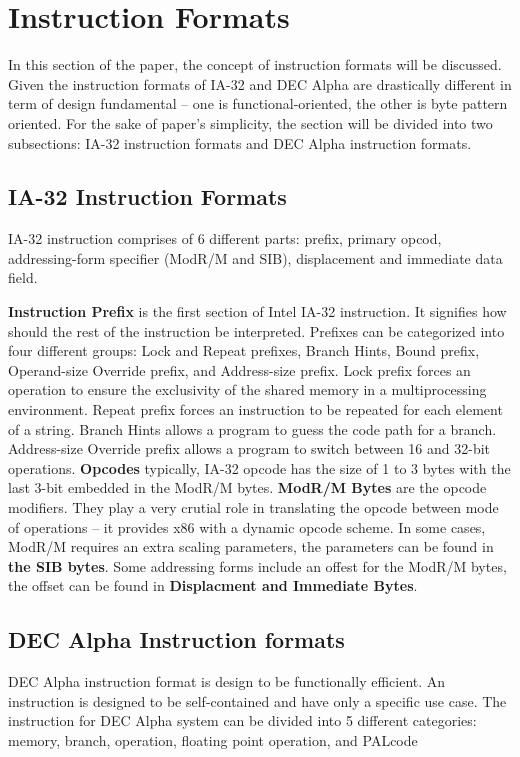 \documentclass[letterpaper,10pt,titlepage]{article}
\begin{document}
\section{Instruction Formats}
In this section of the paper, the concept of instruction formats  will be
discussed. Given the instruction formats of IA-32 and DEC Alpha are drastically 
different in term of design fundamental -- one is functional-oriented, the other is
byte pattern oriented. For the sake of paper's simplicity, the section will be divided 
into two subsections: IA-32 instruction formats and DEC Alpha instruction formats. 
\subsection{IA-32 Instruction Formats}
IA-32 instruction comprises of 6 different parts: prefix, primary opcod, addressing-form
specifier (ModR/M and SIB), displacement and immediate data field. 


\textbf{Instruction Prefix} is the first section of Intel IA-32 instruction. 
It signifies how should the rest of the instruction be interpreted. Prefixes can be 
categorized into four different groups: Lock and Repeat prefixes, Branch Hints, Bound
prefix, Operand-size Override prefix, and Address-size prefix. Lock prefix 
forces an operation to ensure the exclusivity of the shared memory in a multiprocessing 
environment. Repeat prefix forces an instruction to be repeated for each element
of a string. Branch Hints allows a program to guess the code path for a branch.
Address-size Override prefix allows a program to switch between 16 and 32-bit 
operations. \textbf{Opcodes} typically, IA-32 opcode has the size of 1 to 3 bytes with
the last 3-bit embedded in the ModR/M bytes. \textbf{ModR/M Bytes} are the 
opcode modifiers. They play a very crutial role in translating the opcode between mode
of operations -- it provides x86 with a dynamic opcode scheme. In some cases, ModR/M
requires an extra scaling parameters, the parameters can be found in \textbf{the SIB 
bytes}. Some addressing forms include an offest for the ModR/M bytes, the offset can be 
found in \textbf{Displacment and Immediate Bytes}. 

\subsection{DEC Alpha Instruction formats}
DEC Alpha instruction format is design to be functionally efficient. 
An instruction is designed to be self-contained and have only a specific use case.
The instruction for DEC Alpha system can be divided into 5 different categories:
memory, branch, operation, floating point operation, and PALcode
\end{document}
